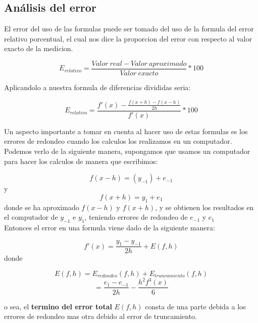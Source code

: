 \documentclass[journal,transmag]{IEEEtran}
\theoremstyle{mytheoremstyle}
\theoremstyle{mytheoremstyle}
\theoremstyle{myproblemstyle}
\begin{document}
\subsection{Análisis del error}

El error del uso de las formulas puede ser tomado del uso de la formula del error relativo porcentual, el cual nos dice la proporcion del error con respecto al valor exacto de la medicion.

\begin{equation}
    E_{relativo}=\frac{{Valor\ real} - Valor\ aproximado}{Valor\ exacto}*100
\end{equation}

Aplicandolo a nuestra formula de diferencias divididas seria:

\begin{equation}
    E_{relativo}=\frac{f'(x) - \frac{f(x+h)-f(x-h)}{2h}}{f'(x)}*100
\end{equation}

Un aspecto importante a tomar en cuenta al hacer uso de estas formulas es los errores de redondeo cuando los calculos los realizamos en un computador. Podemos verlo de la siguiente manera, supongamos que usamos un computador para hacer los calculos de manera que escribimos:

\begin{equation}
    f(x-h)=(y_{-1}) + e_{-1} 
\end{equation}
y 
\begin{equation}
    f(x+h)=y_1 +e_1
\end{equation}
donde se ha aproximado $f(x-h)$ y $f(x+h)$, y se obtienen los resultados en el computador de $y_{-1}$ e $y_1$, teniendo errores de redondeo de $e_{-1}$ y $e_1$\\

Entonces el error en una formula viene dado de la siguiente manera:

\begin{equation}
    f'(x)=\frac{y_1-y_{-1}}{2h}+E(f,h)
\end{equation}
donde 

\begin{equation}
        E(f,h)=E_{redondeo}(f,h)+E_{truncamiento}(f,h)
\end{equation}
\begin{equation}
    =\frac{e_1-e_{-1}}{2h}-\frac{h^2f^3(x)}{6}
\end{equation}

o sea, el \textbf{termino del error total} $E(f,h)$ consta de una parte debida a los errores de redondeo mas otra debido al error de truncamiento.
\end{document}
